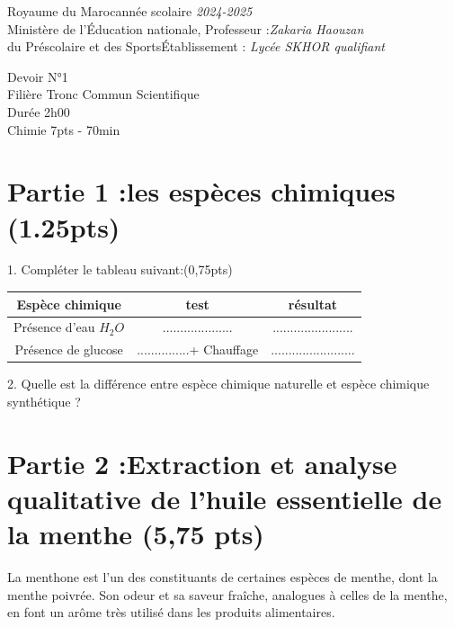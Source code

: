 \documentclass[12pt]{article}
\newcommand\headerMe[2]{\noindent{}#1\hfill#2}
\begin{document}
\headerMe{Royaume du Maroc}{année scolaire \emph{2024-2025}}\\
\headerMe{Ministère de l'Éducation nationale, }{  Professeur :\emph{Zakaria Haouzan}}\\
\headerMe{du Préscolaire et des Sports}{Établissement : \emph{Lycée SKHOR qualifiant}}\\

\begin{center}

    \vspace{-1.5cm}
Devoir  N°1 \\
   Filière Tronc Commun Scientifique\\
Durée 2h00
\\
\hrulefill
\Large{Chimie 7pts - 70min}
\hrulefill\\

\end{center}
 
    \vspace{-1.2cm}
    
\section*{Partie 1 :les espèces chimiques \dotfill (1.25pts) }
	
	1. Compléter le tableau suivant:\dotfill(0,75pts)
\begin{center}
\begin{tabular}{ | c | c | c | }
	\hline
	\textbf{Espèce chimique }& \textbf{test} & \textbf{résultat} \\\hline 
 Présence d’eau $H_2O$ & .................... & ....................... \\\hline  
 
Présence de glucose  & ...............+ Chauffage& ........................\\\hline 
\end{tabular}
\end{center}

2. Quelle est la différence entre espèce chimique naturelle et espèce chimique synthétique ?

\section*{Partie 2 :Extraction et analyse qualitative de l’huile essentielle de la menthe \dotfill (5,75 pts) }
\hspace{0.5cm}
La menthone est l’un des constituants de certaines espèces de menthe, dont la menthe poivrée. Son
odeur et sa saveur fraîche, analogues à celles de la menthe, en font un arôme très utilisé dans les
produits alimentaires.
\end{document}

